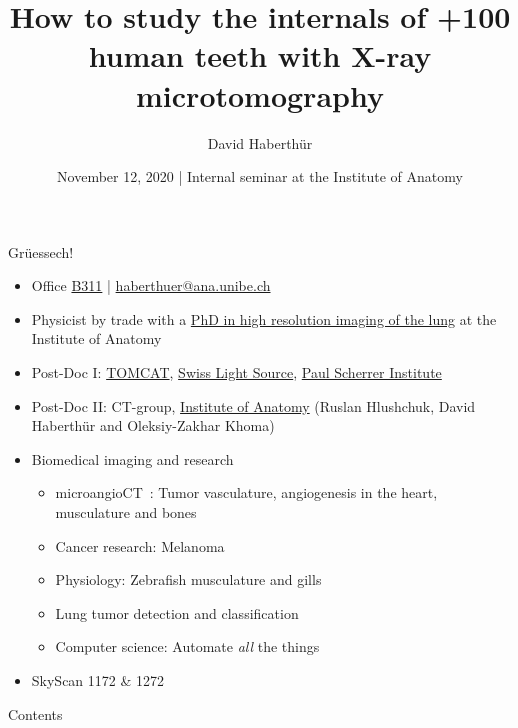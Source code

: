 \documentclass[aspectratio=169]{beamer}
\title{How to study the internals of +100 human teeth with X-ray microtomography}
\author{David Haberthür}
\date{November 12, 2020 | Internal seminar at the Institute of Anatomy}
\newcommand{\uct}{\si{\micro}CT\xspace}%
\begin{document}
{%
	\begin{frame}%
		\maketitle
	\end{frame}%
}

\begin{frame}{Grüessech!}
	\begin{itemize}
		\item Office \href{http://osm.org/go/0CZwlGp3A?m}{B311} | \href{mailto:haberthuer@ana.unibe.ch?subject=Feedback\%20from\%20the\%20(micro)-tomography\%20lecture}{haberthuer@ana.unibe.ch}
		\item Physicist by trade with a \href{https://boris.unibe.ch/2619/}{PhD in high resolution imaging of the lung} at the Institute of Anatomy
		\item Post-Doc I: \href{https://www.psi.ch/sls/tomcat/}{TOMCAT}, \href{https://www.psi.ch/sls/}{Swiss Light Source}, \href{https://www.psi.ch/}{Paul Scherrer Institute}
		\item Post-Doc II: \uct-group, \href{https://ana.unibe.ch}{Institute of Anatomy} (Ruslan Hlushchuk, David Haberthür and Oleksiy-Zakhar Khoma)
		\item Biomedical imaging and research
		\begin{itemize}
			\item microangioCT~\cite{Hlushchuk2018}: Tumor vasculature, angiogenesis in the heart, musculature and bones
			\item Cancer research: Melanoma
			\item Physiology: Zebrafish musculature and gills~\cite{MesserliAaldijk2020}			
			\item Lung tumor detection and classification
			\item Computer science: Automate \emph{all} the things~\cite{Haberthur2020}
		\end{itemize}
	\item<1-> SkyScan 1172 \& 1272 							
	\end{itemize}
\end{frame}

\begin{frame}{Contents}
	\tableofcontents
\end{frame}
\end{document}
